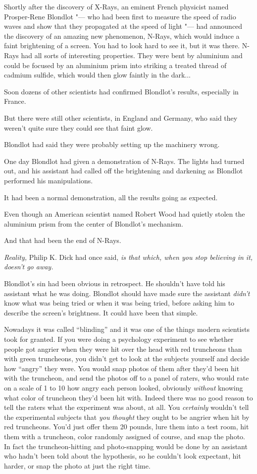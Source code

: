 Shortly after the discovery of X-Rays, an eminent French physicist named
Prosper-Rene Blondlot "--- who had been first to measure the speed of radio
waves and show that they propagated at the speed of light "--- had
announced the discovery of an amazing new phenomenon, N-Rays, which
would induce a faint brightening of a screen. You had to look hard to
see it, but it was there. N-Rays had all sorts of interesting
properties. They were bent by aluminium and could be focused by an
aluminium prism into striking a treated thread of cadmium sulfide, which
would then glow faintly in the dark...

Soon dozens of other scientists had confirmed Blondlot's results,
especially in France.

But there were still other scientists, in England and Germany, who said
they weren't quite sure they could see that faint glow.

Blondlot had said they were probably setting up the machinery wrong.

One day Blondlot had given a demonstration of N-Rays. The lights had
turned out, and his assistant had called off the brightening and
darkening as Blondlot performed his manipulations.

It had been a normal demonstration, all the results going as expected.

Even though an American scientist named Robert Wood had quietly stolen
the aluminium prism from the center of Blondlot's mechanism.

And that had been the end of N-Rays.

\emph{Reality,} Philip K. Dick had once said, \emph{is that which, when
you stop believing in it, doesn't go away.}

Blondlot's sin had been obvious in retrospect. He shouldn't have told
his assistant what he was doing. Blondlot should have made sure the
assistant \emph{didn't} know what was being tried or when it was being
tried, before asking him to describe the screen's brightness. It could
have been that simple.

Nowadays it was called ``blinding'' and it was one of the things modern
scientists took for granted. If you were doing a psychology experiment
to see whether people got angrier when they were hit over the head with
red truncheons than with green truncheons, you didn't get to look at the
subjects yourself and decide how ``angry'' they were. You would snap
photos of them after they'd been hit with the truncheon, and send the
photos off to a panel of raters, who would rate on a scale of 1 to 10
how angry each person looked, obviously \emph{without} knowing what
color of truncheon they'd been hit with. Indeed there was no good reason
to tell the raters what the experiment was about, at all. You
\emph{certainly} wouldn't tell the experimental subjects that \emph{you
thought} they ought to be angrier when hit by red truncheons. You'd just
offer them 20 pounds, lure them into a test room, hit them with a
truncheon, color randomly assigned of course, and snap the photo. In
fact the truncheon-hitting and photo-snapping would be done by an
assistant who hadn't been told about the hypothesis, so he couldn't look
expectant, hit harder, or snap the photo at just the right time.

